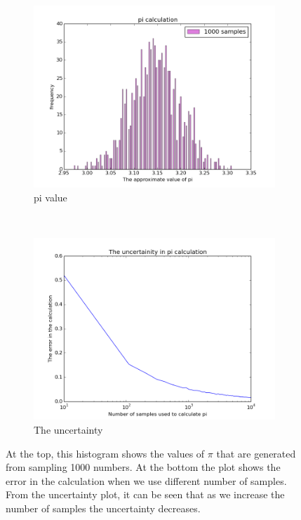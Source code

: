 \begin{figure}
    \centering
    \begin{subfigure}[b]{0.5\textwidth}
        \includegraphics[scale=.5]{images/pi_value.png} 
        \caption{pi value}
        \label{fig:gull}
    \end{subfigure}
    ~ %
    \begin{subfigure}[b]{0.5\textwidth}
        \includegraphics[scale=0.5]{images/uncertainity_pi.png}
        \caption{The uncertainty}
        \label{fig:tiger}
    \end{subfigure}
    \label{Fig:1}
\caption{At the top, this histogram shows the values of $\pi$ that are generated from sampling 1000 numbers. At the bottom the plot shows the error in the calculation when we use different number of samples. From the uncertainty plot, it can be seen that as we increase the number of samples the uncertainty decreases.} 
\label{fig:1.1}
\end{figure}           